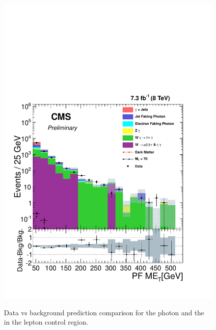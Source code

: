 \begin{figure}[!hp]
{\label{fig:leptonMET}\includegraphics[scale=0.4]{analysis_figs/lepton_met.pdf}}
\caption{ Data vs background prediction comparison for the photon \pt and the \met in the lepton control region.}
\label{fig:WG_CRI}
\end{figure}

